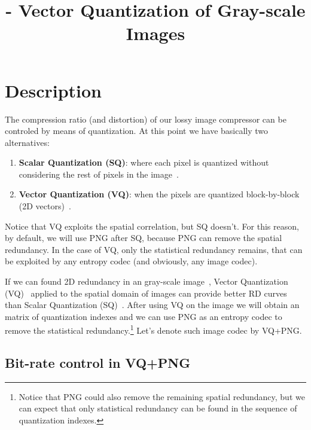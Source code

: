 

\title{\SM{} - Vector Quantization of Gray-scale Images}

\maketitle
\tableofcontents

\section{Description}

The compression ratio (and distortion) of our lossy image compressor
can be controled by means of quantization. At this point we have
basically two alternatives:
\begin{enumerate}
\item \textbf{Scalar Quantization (SQ)}: where each pixel is quantized
  without considering the rest of pixels in the
  image~\cite{vruiz__scalar_quantization}.
\item \textbf{Vector Quantization (VQ)}: when the pixels are quantized
  block-by-block (2D vectors)~\cite{vruiz__vector_quantization}.
\end{enumerate}
Notice that VQ exploits the spatial correlation, but SQ doesn't. For
this reason, by default, we will use PNG after SQ, because PNG can
remove the spatial redundancy. In the case of VQ, only the statistical
redundancy remains, that can be exploited by any entropy codec (and
obviously, any image codec).

If we can found 2D redundancy in an gray-scale
image~\cite{vruiz__image_IO}, Vector Quantization
(VQ)~\cite{vruiz__vector_quantization} applied to the spatial domain
of images can provide better RD curves than Scalar Quantization
(SQ)~\cite{vruiz__scalar_quantization}. After using VQ on the image we
will obtain an matrix of quantization indexes and we can use PNG as an
entropy codec to remove the statistical redundancy.\footnote{Notice
that PNG could also remove the remaining spatial redundancy, but we
can expect that only statistical redundancy can be found in the
sequence of quantization indexes.} Let's denote such image codec by
VQ+PNG.


\subsection{Bit-rate control in VQ+PNG}

